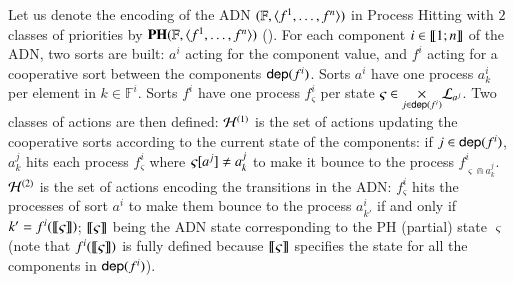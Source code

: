 Let us denote the encoding of the ADN $(\mathbb F, \langle f^1, \dots, f^n\rangle)$ in Process Hitting with $2$ classes
of priorities by $\mathbf{PH}(\mathbb F, \langle f^1, \dots, f^n\rangle)$ ().
For each component $i\in\llbracket 1; n \rrbracket$ of the ADN, two sorts are built: $a^i$ acting for the component
value, and $f^i$ acting for a cooperative sort between the components $\mathsf{dep}(f^i)$.
Sorts $a^i$ have one process $a^i_k$ per element in $k\in\mathbb F^i$.
Sorts $f^i$ have one process $f^i_\varsigma$ per state $\varsigma \in \underset{j\in\mathsf{dep}(f^i)}{\times}
\mathcal{L}_{a^j}$.
Two classes of actions are then defined:
$\mathcal{H}^{(1)}$ is the set of actions updating the cooperative sorts according to the current state of the
components:
if $j\in\mathsf{dep}(f^i)$, $a^j_k$ hits each process $f^i_\varsigma$ where $\varsigma[{a^j}]\neq
a^j_k$ to make it bounce to the process $f^i_{\varsigma \Cap a^j_k}$.
$\mathcal{H}^{(2)}$ is the set of actions encoding the transitions in the ADN:
$f^i_\varsigma$ hits the processes of sort $a^i$ to make them bounce to the process
$a^i_{k'}$ if and only if $k'=f^i(\llbracket\varsigma\rrbracket)$;
$\llbracket\varsigma\rrbracket$ being the ADN state corresponding to the PH (partial) state $\varsigma$ (note that
$f^i(\llbracket\varsigma\rrbracket)$ is fully defined because $\llbracket\varsigma\rrbracket$ specifies the state for all
the components in $\mathsf{dep}(f^i)$).

